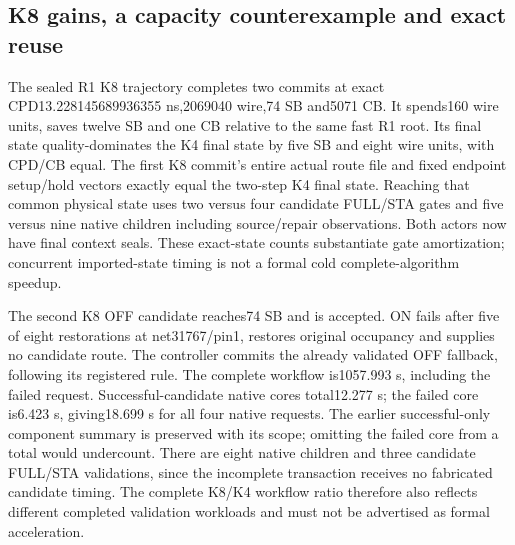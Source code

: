 \subsection{K8 gains, a capacity counterexample and exact reuse}
The sealed R1 K8 trajectory completes two commits at exact CPD13.228145689936355 ns,2069040 wire,74 SB and5071 CB. It spends160 wire units, saves twelve SB and one CB relative to the same fast R1 root. Its final state quality-dominates the K4 final state by five SB and eight wire units, with CPD/CB equal. The first K8 commit's entire actual route file and fixed endpoint setup/hold vectors exactly equal the two-step K4 final state. Reaching that common physical state uses two versus four candidate FULL/STA gates and five versus nine native children including source/repair observations. Both actors now have final context seals. These exact-state counts substantiate gate amortization; concurrent imported-state timing is not a formal cold complete-algorithm speedup.

The second K8 OFF candidate reaches74 SB and is accepted. ON fails after five of eight restorations at net31767/pin1, restores original occupancy and supplies no candidate route. The controller commits the already validated OFF fallback, following its registered rule. The complete workflow is1057.993 s, including the failed request. Successful-candidate native cores total12.277 s; the failed core is6.423 s, giving18.699 s for all four native requests. The earlier successful-only component summary is preserved with its scope; omitting the failed core from a total would undercount. There are eight native children and three candidate FULL/STA validations, since the incomplete transaction receives no fabricated candidate timing. The complete K8/K4 workflow ratio therefore also reflects different completed validation workloads and must not be advertised as formal acceleration.

